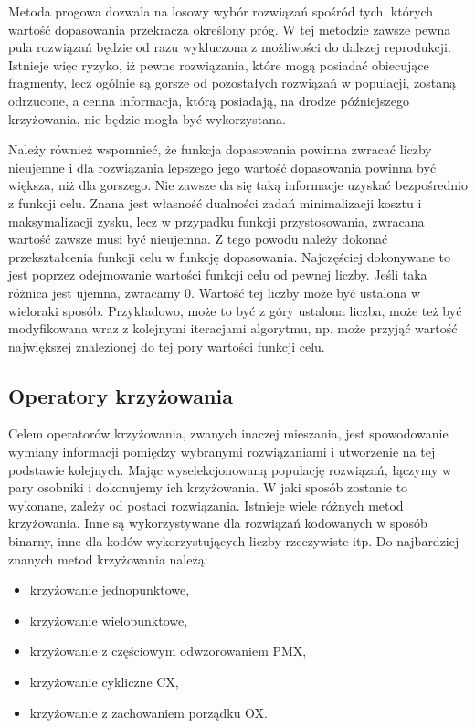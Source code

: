 Metoda progowa dozwala na losowy wybór rozwiązań spośród tych, których wartość dopasowania przekracza określony próg. W tej metodzie zawsze pewna pula rozwiązań będzie od razu wykluczona z możliwości do dalszej reprodukcji. Istnieje więc ryzyko, iż pewne rozwiązania, które mogą posiadać obiecujące fragmenty, lecz ogólnie są gorsze od pozostałych rozwiązań w populacji, zostaną odrzucone, a cenna informacja, którą posiadają, na drodze późniejszego krzyżowania, nie będzie mogła być wykorzystana.

Należy również wspomnieć, że funkcja dopasowania powinna zwracać liczby nieujemne i dla rozwiązania lepszego jego wartość dopasowania powinna być większa, niż dla gorszego. Nie zawsze da się taką informacje uzyskać bezpośrednio z funkcji celu. Znana jest własność dualności zadań minimalizacji kosztu i maksymalizacji zysku, lecz w przypadku funkcji przystosowania, zwracana wartość zawsze musi być nieujemna. Z tego powodu należy dokonać przekształcenia funkcji celu w funkcję dopasowania. Najczęściej  dokonywane to jest poprzez odejmowanie wartości funkcji celu od pewnej liczby. Jeśli taka różnica jest ujemna, zwracamy 0. Wartość tej liczby może być ustalona w wieloraki sposób. Przykładowo, może to być z góry ustalona liczba, może też być modyfikowana wraz z kolejnymi iteracjami algorytmu, np. może przyjąć wartość największej znalezionej do tej pory wartości funkcji celu.

\subsection{Operatory krzyżowania}
Celem operatorów krzyżowania, zwanych inaczej mieszania, jest spowodowanie wymiany informacji pomiędzy wybranymi rozwiązaniami i utworzenie na tej podstawie kolejnych. Mając wyselekcjonowaną populację rozwiązań, łączymy w pary osobniki i dokonujemy ich krzyżowania. W jaki sposób zostanie to wykonane, zależy od postaci rozwiązania. Istnieje wiele różnych metod krzyżowania. Inne są wykorzystywane dla rozwiązań kodowanych w sposób binarny, inne dla kodów wykorzystujących liczby rzeczywiste itp. Do najbardziej znanych metod krzyżowania należą:
\begin{itemize}
\item krzyżowanie jednopunktowe,
\item krzyżowanie wielopunktowe,
\item krzyżowanie z częściowym odwzorowaniem PMX,
\item krzyżowanie cykliczne CX,
\item krzyżowanie z zachowaniem porządku OX.
\end{itemize}

